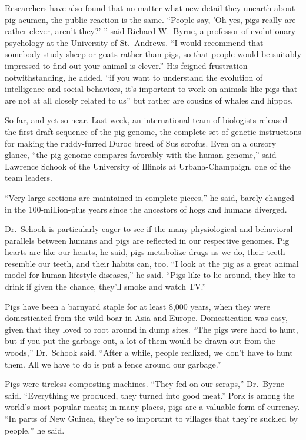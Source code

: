 ﻿\documentclass[12pt]{article}
\begin{document}
Researchers have also found that no matter what new detail they unearth about pig acumen, the public
reaction is the same. ``People say, 'Oh yes, pigs really are rather clever, aren't they?' '' said
Richard W.~Byrne, a professor of evolutionary psychology at the University of St.~Andrews. ``I would
recommend that somebody study sheep or goats rather than pigs, so that people would be suitably
impressed to find out your animal is clever.'' His feigned frustration notwithstanding, he added,
``if you want to understand the evolution of intelligence and social behaviors, it's important to
work on animals like pigs that are not at all closely related to us'' but rather are cousins of
whales and hippos.

So far, and yet so near. Last week, an international team of biologists released the first draft
sequence of the pig genome, the complete set of genetic instructions for making the ruddy-furred
Duroc breed of Sus scrofus. Even on a cursory glance, ``the pig genome compares favorably with the
human genome,'' said Lawrence Schook of the University of Illinois at Urbana-Champaign, one of the
team leaders.

``Very large sections are maintained in complete pieces,'' he said, barely changed in the
100-million-plus years since the ancestors of hogs and humans diverged.

Dr.~Schook is particularly eager to see if the many physiological and behavioral parallels between
humans and pigs are reflected in our respective genomes. Pig hearts are like our hearts, he said,
pigs metabolize drugs as we do, their teeth resemble our teeth, and their habits can, too. ``I look
at the pig as a great animal model for human lifestyle diseases,'' he said. ``Pigs like to lie
around, they like to drink if given the chance, they'll smoke and watch TV.''

Pigs have been a barnyard staple for at least 8,000 years, when they were domesticated from the wild
boar in Asia and Europe. Domestication was easy, given that they loved to root around in dump sites.
``The pigs were hard to hunt, but if you put the garbage out, a lot of them would be drawn out from
the woods,'' Dr.~Schook said. ``After a while, people realized, we don't have to hunt them. All we
have to do is put a fence around our garbage.''

Pigs were tireless composting machines. ``They fed on our scraps,'' Dr.~Byrne said. ``Everything we
produced, they turned into good meat.'' Pork is among the world's most popular meats; in many
places, pigs are a valuable form of currency. ``In parts of New Guinea, they're so important to
villages that they're suckled by people,'' he said.
\end{document}
